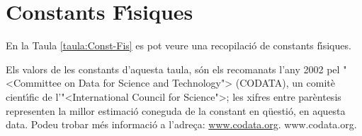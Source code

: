 \chapter{Constants F\'{\i}siques} 


En la Taula \vref{taula:Const-Fis} es pot veure una recopilaci\'{o} de
constants f\'{\i}siques.

Els valors de les constants d'aquesta taula, s\'{o}n els recomanats
l'any 2002 pel {"<}Committee on Data for Science and Technology{">}
(\textsf{CODATA}), un comit\`{e} cient\'{\i}fic de l'{"<}International Council
for Science{">}; les xifres entre par\`{e}ntesis representen la millor
estimaci\'{o} coneguda de la constant en q\"{u}esti\'{o}, en aquesta
data. Podeu trobar  m\'{e}s informaci\'{o} a
l'adre\c{c}a: \ifpdf
    \href{http://www.codata.org/}{www.codata.org}.
\else
    www.codata.org.
\fi

